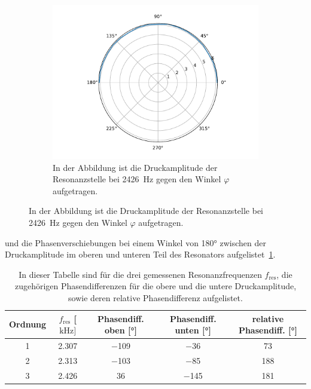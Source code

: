 \begin{figure}[ht]
                \centering
                \begin{subfigure}[b]{0.45\textwidth}
                    \centering
                    \includegraphics[scale=0.3]{./pictures/H_mol_resonanz_1_2426Hz.pdf}
                    \caption{In der Abbildung ist die Druckamplitude der Resonanzstelle bei \SI{2426}{\hertz} gegen den Winkel $\varphi$ aufgetragen.}
                    \label{fig:H_mol_resonanz_1_2426Hz}
                \end{subfigure}
            \end{figure}
            \FloatBarrier
            und die Phasenverschiebungen bei einem Winkel von 180° zwischen der Druckamplitude im oberen und unteren Teil des Resonators aufgelistet~\ref{tab:rel_phasenverschiebung}.
            \FloatBarrier
            \begin{table}[h]
                \centering
                \caption{In dieser Tabelle sind für die drei gemessenen Resonanzfrequenzen $f_{\text{res}}$, die zugehörigen Phasendifferenzen für die obere und die untere Druckamplitude, sowie deren relative Phasendifferenz aufgelistet.}
                \label{tab:rel_phasenverschiebung}
                \begin{tabular}{c c c c c}
                \toprule
                {Ordnung} & {$f_{\text{res}}$ [$\si{\kilo\hertz}]$} & {Phasendiff. oben [°]} & {Phasendiff. unten [°]} & {relative Phasendiff. [°]} \\
                \midrule
                \num{1}  & \num{2.307}  &  \num{-109}  &  \num{-36}   & \num{73}      \\
                \num{2}  & \num{2.313}  &  \num{-103}  &  \num{-85}   & \num{188}     \\
                \num{3}  & \num{2.426}  &  \num{36}    &  \num{-145}  & \num{181}     \\
                \bottomrule
                \end{tabular}
            \end{table}
